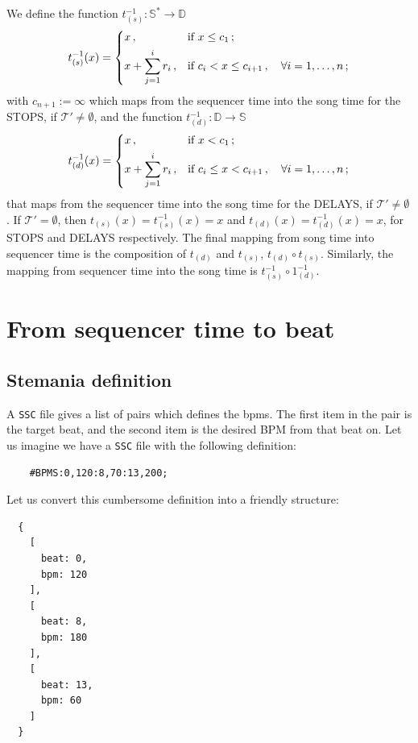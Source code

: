\documentclass[a4paper,9pt]{article}
\begin{document}
We define the function $ t_{(s)}^{-1}: \mathbb{S^{*}}\rightarrow \mathbb{D} $
\begin{equation}
	t_{(s)}^{-1}(x) = \begin{dcases}
		x\,, & \text{if $ x \leq c_1 $}\,;\\
		x+ \sum_{j=1}^{i}r_i\,, & \text{if $ c_i < x \leq c_{i+1}\,,\quad \forall i=1,\dots,n$}\,;\\
	\end{dcases}
	\label{eq:t-1s}
\end{equation}
with $ c_{n+1} := \infty $ which maps from the sequencer time into the song time for the STOPS, if $ \mathcal{T'} \neq \emptyset $, and the function $ t_{(d)}^{-1}: \mathbb{D}\rightarrow \mathbb{S} $
\begin{equation}
	t_{(d)}^{-1}(x) = \begin{dcases}
		x\,, & \text{if $ x < c_1 $}\,;\\
		x+ \sum_{j=1}^{i}r_i\,, & \text{if $ c_i \leq x < c_{i+1}\,,\quad \forall i=1,\dots,n$}\,;\\
	\end{dcases}
	\label{eq:t-1s}
\end{equation}
that maps from the sequencer time into the song time for the DELAYS, if $ \mathcal{T'}\neq \emptyset $. If $ \mathcal{T'} = \emptyset $, then $ t_{(s)}(x) = t_{(s)}^{-1}(x) = x$ and $t_{(d)}(x) = t_{(d)}^{-1} (x) = x $, for STOPS and DELAYS respectively.
The final mapping from song time into sequencer time is the composition of $t_{(d)}$ and $ t_{(s)} $, $ t_{(d)}\circ t_{(s)} $. Similarly, the mapping from sequencer time into the song time is $ t_{(s)}^{-1}\circ 1_{(d)}^{-1} $.
    \section{From sequencer time to beat}

    \subsection{Stemania definition}\label{sec:stepmania-definition-time2beat}
    
    A \texttt{SSC} file gives a list of pairs which defines the bpms. The first item in the pair is the target beat, and the second item is the desired BPM from that beat on. Let us imagine we have a \texttt{SSC} file with the following definition:
    \begin{verbatim}
    #BPMS:0,120:8,70:13,200;     
    \end{verbatim}
    Let us convert this cumbersome definition into a friendly structure:
    \begin{verbatim}
  {
    [
      beat: 0,
      bpm: 120
    ],
    [
      beat: 8,
      bpm: 180 
    ],
    [
      beat: 13,
      bpm: 60 
    ]
  }
    \end{verbatim}
\end{document}

